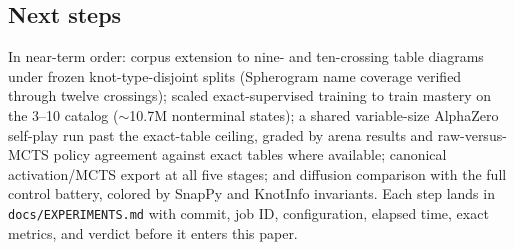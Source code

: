 \subsection{Next steps}
\label{sec:next}

In near-term order: corpus extension to nine- and ten-crossing table diagrams
under frozen knot-type-disjoint splits (Spherogram name coverage verified
through twelve crossings); scaled exact-supervised training to train mastery
on the 3--10 catalog ($\sim$10.7M nonterminal states); a shared
variable-size AlphaZero self-play run past the exact-table ceiling, graded by
arena results and raw-versus-MCTS policy agreement against exact tables where
available; canonical activation/MCTS export at
all five stages; and diffusion comparison with the full control battery,
colored by SnapPy and KnotInfo invariants. Each
step lands in \texttt{docs/EXPERIMENTS.md} with commit, job ID, configuration,
elapsed time, exact metrics, and verdict before it enters this paper.
